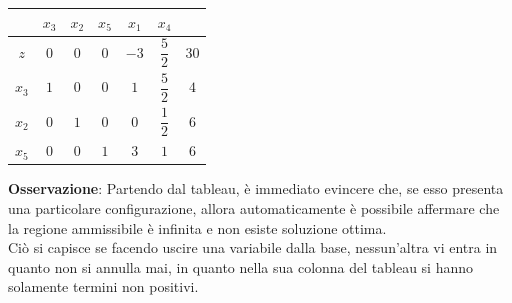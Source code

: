 \documentclass[a4paper]{extarticle}
\renewcommand\arraystretch{}
\begin{document}
\begin{table}[H]
    \setlength{\tabcolsep}{4pt}
    \renewcommand{\arraystretch}{2.2}
    \noindent
    \centering
    \begin{tabular}{|c|ccc|cc|c|}
        & $x_3$ & $x_2$ & $x_5$ & $x_1$ & $x_4$ &\\
        \hline
        $z$ & $0$ & $0$ & $0$ & $-3$ & $\dfrac{5}{2}$ & $30$\\
        \hline
        $x_3$ & \cellcolor{red!50!white}$1$ & \cellcolor{red!50!white}$0$ & \cellcolor{red!50!white}$0$ & \cellcolor{blue!50!white}$1$ & \cellcolor{blue!50!white}$\dfrac{5}{2}$ & \cellcolor{orange!25!white}$4$\\
        $x_2$ & \cellcolor{red!50!white}$0$ & \cellcolor{red!50!white}$1$ & \cellcolor{red!50!white}$0$ & \cellcolor{blue!50!white}$0$ & \cellcolor{blue!50!white}$\dfrac{1}{2}$ & \cellcolor{orange!25!white}$6$\\
        $x_5$ & \cellcolor{red!50!white}$0$ & \cellcolor{red!50!white}$0$ & \cellcolor{red!50!white}$1$ & \cellcolor{blue!50!white}$3$ & \cellcolor{blue!50!white}$1$ & \cellcolor{orange!25!white}$6$\\
        \hline
    \end{tabular}
\end{table}

\vspace{1em}
\noindent
\textbf{Osservazione}: Partendo dal tableau, è immediato evincere che, se esso presenta una particolare configurazione, allora automaticamente è possibile affermare che la regione ammissibile è infinita e non esiste soluzione ottima.\\
Ciò si capisce se facendo uscire una variabile dalla base, nessun'altra vi entra in quanto non si annulla mai, in quanto nella sua colonna del tableau si hanno solamente termini non positivi.
\end{document}
